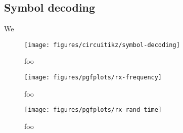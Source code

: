 \FloatBarrier
\subsection{Symbol decoding}

We 

\begin{figure}[htb]
	\centering
	\texttt{[image: figures/circuitikz/symbol-decoding]}
	\caption{foo}
\end{figure}

\begin{figure}[htb]
	\centering
	\texttt{[image: figures/pgfplots/rx-frequency]}
	\caption{foo}
\end{figure}

\begin{figure}[htb]
	\centering
	\texttt{[image: figures/pgfplots/rx-rand-time]}
	\caption{foo}
\end{figure}